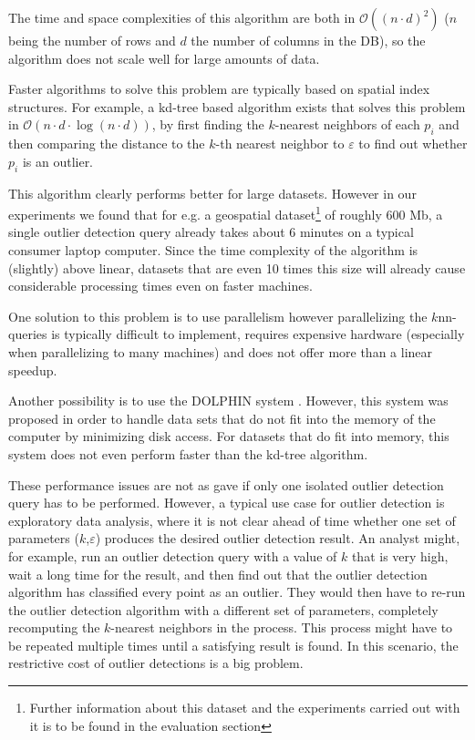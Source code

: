 \documentclass[runningheads]{llncs}
\begin{document}
The time and space complexities of this algorithm are both in $\mathcal{O}((n\cdot d)^2)$ ($n$ being the number of rows and $d$ the number of columns in the DB), so the algorithm does not scale well for large amounts of data.

Faster algorithms to solve this problem are typically based on spatial index structures. For example, a kd-tree based algorithm exists that solves this problem in $\mathcal{O}(n\cdot d \cdot\log(n\cdot d))$, by first finding the $k$-nearest neighbors of each $p_i$ and then comparing the distance to the $k$-th nearest neighbor to $\varepsilon$ to find out whether $p_i$ is an outlier. 

This algorithm clearly performs better for large datasets. However in our experiments we found that for e.g. a geospatial dataset\footnote{Further information about this dataset and the experiments carried out with it is to be found in the evaluation section} of roughly 600 Mb, a single outlier detection query already takes about 6 minutes on a typical consumer laptop computer. Since the time complexity of the algorithm is (slightly) above linear, datasets that are even 10 times this size will already cause considerable processing times even on faster machines.

One solution to this problem is to use parallelism %
however parallelizing the $k$nn-queries is typically difficult to implement, requires expensive hardware (especially when parallelizing to many machines) and does not offer more than a linear speedup.

Another possibility is to use the DOLPHIN system%
. However, this system was proposed in order to handle data sets that do not fit into the memory of the computer by minimizing disk access. For datasets that do fit into memory, this system does not even perform faster than the kd-tree algorithm.

These performance issues are not as gave if only one isolated outlier detection query has to be performed. However, a typical use case for outlier detection is exploratory data analysis, where it is not clear ahead of time whether one set of parameters ($k$,$\varepsilon$) produces the desired outlier detection result. An analyst might, for example, run an outlier detection query with a value of $k$ that is very high, wait a long time for the result, and then find out that the outlier detection algorithm has classified every point as an outlier. They would then have to re-run the outlier detection algorithm with a different set of parameters, completely recomputing the $k$-nearest neighbors in the process. This process might have to be repeated multiple times until a satisfying result is found. In this scenario, the restrictive cost of outlier detections is a big problem.
\end{document}
